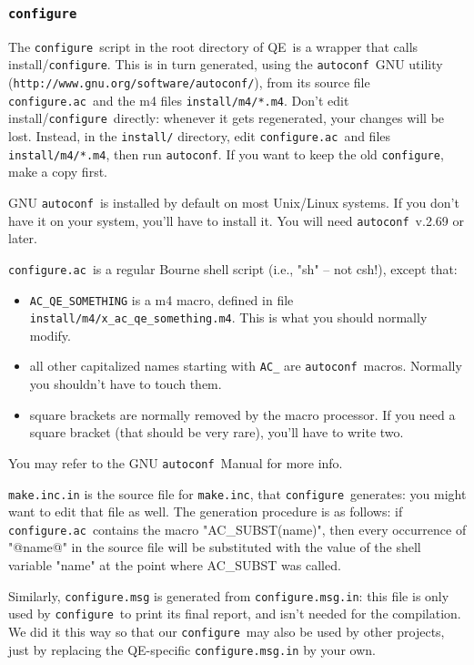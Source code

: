 \documentclass[12pt,a4paper]{article}
\def\qe{QE}
\def\configure{\texttt{configure}}
\def\configurac{\texttt{configure.ac}}
\def\autoconf{\texttt{autoconf}}
\def\make.inc{\texttt{make.inc}}
\begin{document}
\subsubsection{\configure}

\label{SubSec:conf}
The \configure\ script in the root directory of \qe\ is a wrapper
that calls install/\configure. This is in turn generated, using the
\autoconf\ GNU utility (\texttt{http://www.gnu.org/software/autoconf/}),
from its source file \configurac\ and the m4 files \texttt{install/m4/*.m4}.
Don't edit install/\configure\ directly: whenever it gets regenerated, your
changes will be lost. Instead, in the \texttt{install/} directory, edit
\configurac\ and files \texttt{install/m4/*.m4}, then run \autoconf.
If you want to keep the old \configure, make a copy first.

GNU \autoconf\ is installed by default on most Unix/Linux systems.  If
you don't have it on your system, you'll have to install it. You will
need \autoconf\ v.2.69 or later.

\configurac\ is a regular Bourne shell script (i.e., "sh" -- not csh!),
except that:
\begin{itemize}
\item[--] \texttt{AC\_QE\_SOMETHING} is a m4 macro, defined in file
  \texttt{install/m4/x\_ac\_qe\_something.m4}. This is what you should
  normally modify.
\item[--] all other capitalized names starting with \texttt{AC\_} are
  \autoconf\ macros.  Normally you shouldn't have to touch them.
\item[--] square brackets are normally removed by the macro processor.
  If you need a square bracket (that should be very rare), you'll have
  to write two.
\end{itemize}

You may refer to the GNU \autoconf\ Manual for more info.

\texttt{make.inc.in} is the source file for \make.inc, that
\configure\ generates: you might want to edit that file as well.
The generation procedure is as follows: if \configurac\ contains the macro
"AC\_SUBST(name)", then every occurrence of "@name@" in the source
file will be substituted with the value of the shell variable "name"
at the point where AC\_SUBST was called.

Similarly, \configure\texttt{.msg} is generated from \configure\texttt{.msg.in}: this
file is only used by \configure\ to print its final report, and isn't
needed for the compilation.  We did it this way so that our
\configure\ may also be used by other projects, just by replacing the
\qe-specific \configure\texttt{.msg.in} by your own.
\end{document}
